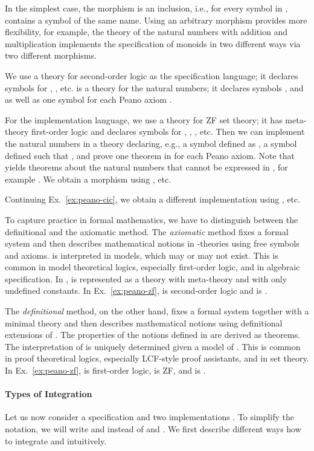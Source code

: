 In the simplest case, the morphism  is an inclusion, i.e., for every symbol in ,  contains a symbol of the same name. Using an arbitrary morphism  provides more flexibility, for example, the theory of the natural numbers with addition and multiplication implements the specification of monoids in two different ways via two different morphisms.

\begin{example}\label{ex:peano-zf}
  We use a theory for second-order logic as the specification language; it declares
  symbols for , , etc.  is a theory for the natural numbers; it
  declares symbols ,  and  as well as one symbol  for each Peano axiom .

  For the implementation language, we use a theory  for ZF set theory; it has
  meta-theory first-order logic and declares symbols for , , , etc. Then we
  can implement the natural numbers in a theory  declaring, e.g., a symbol
   defined as , a symbol  defined such that , and prove
  one theorem  in  for each Peano axiom.  Note that  yields theorems about
  the natural numbers that cannot be expressed in , for example .
  We obtain a morphism  using ,  etc.
  
  Continuing Ex.~\ref{ex:peano-cic}, we obtain a different implementation  using ,  etc.
\end{example}

To capture practice in formal mathematics, we have to distinguish between the definitional
and the axiomatic method.  The \emph{axiomatic} method fixes a formal system  and then
describes mathematical notions in -theories  using free symbols and axioms.   is
interpreted in models, which may or may not exist. This is common in model theoretical
logics, especially first-order logic, and in algebraic specification.  In {\MMT},  is
represented as a theory with meta-theory  and with only undefined constants. In
Ex.~\ref{ex:peano-zf},  is second-order logic and  is .

The \emph{definitional} method, on the other hand, fixes a formal system  together with
a minimal theory  and then describes mathematical notions using definitional
extensions  of . The properties of the notions defined in  are derived as
theorems. The interpretation of  is uniquely determined given a model of . This is
common in proof theoretical logics, especially LCF-style proof assistants, and in set
theory. In Ex.~\ref{ex:peano-zf},  is first-order logic,  is ZF, and  is
.

\paragraph{Types of Integration}
Let us now consider a specification  and two implementations . To simplify the notation, we will write  and  instead of  and .
We first describe different ways how to integrate  and  intuitively.


